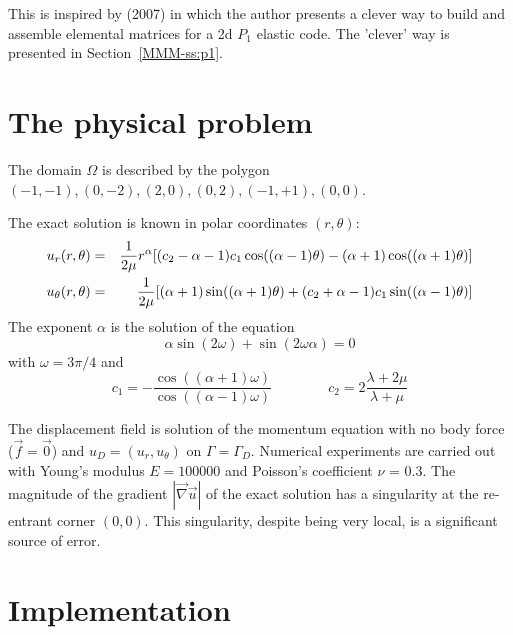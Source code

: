 This \stone is inspired by \textcite{koko07} (2007) in which the author presents 
a clever way to build and assemble elemental matrices for a 2d $P_1$ elastic code.
The 'clever' way is presented in Section~\ref{MMM-ss:p1}.

\section*{The physical problem}

The domain $\Omega$ is described by the polygon
$(-1,-1), (0,-2), (2, 0), (0, 2), (-1,+1), (0, 0)$.

The exact solution is known in polar coordinates $(r,\theta)$:
\begin{eqnarray}
u_r(r,\theta)
&=&\frac{1}{2\mu} r^\alpha 
[(c_2 - \alpha - 1)c_1 \cos((\alpha - 1)\theta) 
- (\alpha + 1) \cos((\alpha + 1)\theta)] \nonumber\\
u_\theta(r,\theta)&=& 
\frac{1}{2\mu}
[(\alpha + 1) \sin((\alpha + 1)\theta) 
+ (c_2 + \alpha - 1)c_1 \sin((\alpha - 1)\theta)]
\end{eqnarray}
The exponent $\alpha$ is the solution of the equation
\[
\alpha \sin(2\omega) + \sin(2\omega \alpha ) = 0
\]
with $\omega=3\pi/4$ and
\[
c_1 = -\frac{\cos((\alpha+1)\omega)}{\cos((\alpha-1)\omega)}
\qquad
\qquad
c_2 = 2 \frac{\lambda + 2\mu}{\lambda+\mu}
\]

The displacement field is solution of the momentum equation 
with no body force ($\vec{f} = \vec{0}$) and $u_D = (u_r , u_\theta )$ on 
$\Gamma = \Gamma_D$. Numerical
experiments are carried out with Young's modulus $E = 100000$ 
and Poisson’s coefficient $\nu$ = 0.3. The magnitude of
the gradient $|\vec\nabla \vec{u}|$ of the exact solution 
has a singularity at the re-entrant corner $(0,0)$. This singularity,
despite being very local, is a significant source of error.

\section*{Implementation}

